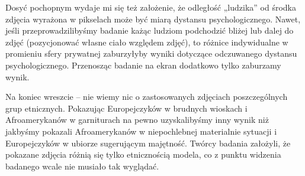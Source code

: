 \documentclass{psychol}
\begin{document}
Dosyć pochopnym wydaje mi się też założenie, że odległość „ludzika” od środka zdjęcia wyrażona w pikselach może być miarą dystansu psychologicznego. Nawet, jeśli przeprowadzilibyśmy badanie każąc ludziom podchodzić bliżej lub dalej do zdjęć (pozycjonować własne ciało względem zdjęć), to różnice indywidualne w promieniu sfery prywatnej zaburzyłyby wyniki dotyczące odczuwanego dystansu psychologicznego. Przenosząc badanie na ekran dodatkowo tylko zaburzamy wynik.

Na koniec wreszcie -- nie wiemy nic o zastosowanych zdjęciach poszczególnych grup etnicznych. Pokazując Europejczyków w brudnych wioskach i Afroamerykanów w garniturach na pewno uzyskalibyśmy inny wynik niż jakbyśmy pokazali Afroamerykanów w niepochlebnej materialnie sytuacji i Europejczyków w ubiorze sugerującym majętność. Twórcy badania założyli, że pokazane zdjęcia różnią się tylko etnicznością modela, co z punktu widzenia badanego wcale nie musiało tak wyglądać.
\end{document}
